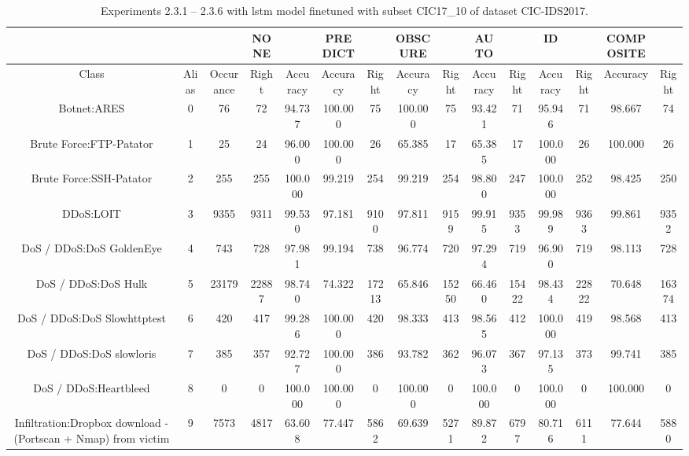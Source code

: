 \begin{table}[htb]
    \centering
    \caption{Experiments 2.3.1 – 2.3.6 with \gls{lstm} model finetuned with subset CIC17\_10 of dataset CIC-IDS2017.}
    \label{table:results:lstm:flows_subset}
    \begin{tabular}{@{}ccccccccccccccc@{}}
        \toprule
         &  &  & NONE &  & PREDICT &  & OBSCURE &  & AUTO &  & ID &  & COMPOSITE &  \\
        \midrule
        Class &  Alias &  Occurance &  Right &  Accuracy &  Accuracy &  Right &  Accuracy &  Right &  Accuracy &  Right &  Accuracy &  Right &  Accuracy &  Right \\
        Botnet:ARES &  0 &  76 &  72 &  94.737 &  100.000 &  75 &  100.000 &  75 &  93.421 &  71 &  95.946 &  71 &  98.667 &  74 \\
        Brute Force:FTP-Patator &  1 &  25 &  24 &  96.000 &  100.000 &  26 &  65.385 &  17 &  65.385 &  17 &  100.000 &  26 &  100.000 &  26 \\
        Brute Force:SSH-Patator &  2 &  255 &  255 &  100.000 &  99.219 &  254 &  99.219 &  254 &  98.800 &  247 &  100.000 &  252 &  98.425 &  250 \\
        DDoS:LOIT &  3 &  9355 &  9311 &  99.530 &  97.181 &  9100 &  97.811 &  9159 &  99.915 &  9353 &  99.989 &  9363 &  99.861 &  9352 \\
        DoS / DDoS:DoS GoldenEye &  4 &  743 &  728 &  97.981 &  99.194 &  738 &  96.774 &  720 &  97.294 &  719 &  96.900 &  719 &  98.113 &  728 \\
        DoS / DDoS:DoS Hulk &  5 &  23179 &  22887 &  98.740 &  74.322 &  17213 &  65.846 &  15250 &  66.460 &  15422 &  98.434 &  22822 &  70.648 &  16374 \\
        DoS / DDoS:DoS Slowhttptest &  6 &  420 &  417 &  99.286 &  100.000 &  420 &  98.333 &  413 &  98.565 &  412 &  100.000 &  419 &  98.568 &  413 \\
        DoS / DDoS:DoS slowloris &  7 &  385 &  357 &  92.727 &  100.000 &  386 &  93.782 &  362 &  96.073 &  367 &  97.135 &  373 &  99.741 &  385 \\
        DoS / DDoS:Heartbleed &  8 &  0 &  0 &  100.000 &  100.000 &  0 &  100.000 &  0 &  100.000 &  0 &  100.000 &  0 &  100.000 &  0 \\
        Infiltration:Dropbox download - (Portscan + Nmap) from victim &  9 &  7573 &  4817 &  63.608 &  77.447 &  5862 &  69.639 &  5271 &  89.872 &  6797 &  80.716 &  6111 &  77.644 &  5880 \\

\end{tabular}
\end{table}
